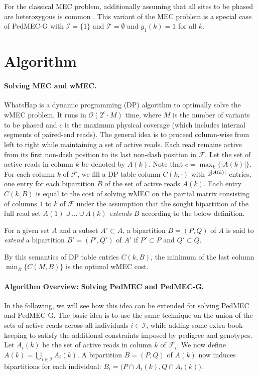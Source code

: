 For the classical MEC problem, additionally assuming that all sites to be phased are heterozygous is common \citep{Chen2013}.
This variant of the MEC problem is a special case of PedMEC-G with $\mathcal{I}=\{1\}$ and $\mathcal{T}=\emptyset$ and $g_1(k)=1$ for all $k$.


\section{Algorithm}\label{sec:algorithm}
\paragraph{Solving MEC and wMEC.}
WhatsHap \citep{Patterson2015} is a dynamic programming (DP) algorithm to optimally solve the wMEC problem.
It runs in $\mathcal{O}(2^c\cdot M)$ time, where $M$ is the number of variants to be phased and $c$ is the maximum physical coverage (which includes internal segments of paired-end reads).
The general idea is to proceed column-wise from left to right while maintaining a set of active reads.
Each read remains active from its first non-dash position to its last non-dash position in $\mathcal{F}$.
Let the set of active reads in column $k$ be denoted by $A(k)$.
Note that $c=\max_{k}\{|A(k)|\}$.
For each column $k$ of $\mathcal{F}$, we fill a DP table column $C(k,\cdot)$ with $2^{\left\lvert A(k) \right\rvert}$ entries, one entry for each bipartition $B$ of the set of active reads $A(k)$.
Each entry $C(k,B)$ is equal to the cost of solving wMEC on the partial matrix consisting of columns $1$ to $k$ of $\mathcal{F}$ under the assumption that the sought bipartition of the full read set $A(1)\cup\ldots\cup A(k)$ \emph{extends} $B$ according to the below definition.
\begin{definition}
For a given set $A$ and a subset $A'\subset A$, a bipartition $B=(P,Q)$ of $A$ is said to \emph{extend} a bipartition $B'=(P',Q')$ of $A'$ if $P'\subset P$ and $Q'\subset Q$.
\end{definition}
By this semantics of DP table entries $C(k,B)$, the minimum of the last column $\min_B\{C(M,B)\}$ is the optimal wMEC cost.

\paragraph{Algorithm Overview: Solving PedMEC and PedMEC-G.}
In the following, we will see how this idea can be extended for solving PedMEC and PedMEC-G.
The basic idea is to use the same technique on the union of the sets of active reads across all individuals $i\in\mathcal{I}$, while adding some extra book-keeping to satisfy the additional constraints imposed by pedigree and genotypes.
Let $A_i(k)$ be the set of active reads in column $k$ of $\mathcal{F}_i$.
We now define $A(k)=\bigcup_{i\in\mathcal{I}}A_i(k)$.
A bipartition $B=(P,Q)$ of $A(k)$ now induces bipartitions for each individual: $B_i=\big(P\cap A_i(k), Q\cap A_i(k)\big)$.

